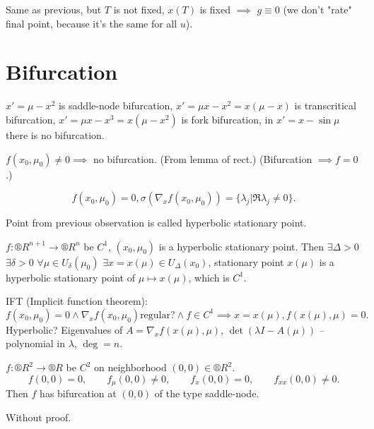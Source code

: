 \documentclass[12pt]{article}					%
\begin{document}
\begin{veta}
	Same as previous, but $T$ is not fixed, $x(T)$ is fixed $\implies$ $g ≡ 0$ (we don't "rate" final point, because it's the same for all $u$).
\end{veta}

\section{Bifurcation}
\begin{definice}
	$x' = \mu - x^2$ is saddle-node bifurcation, $x' = \mu x - x^2 = x(\mu - x)$ is transcritical bifurcation, $x' = \mu x - x^3 = x(\mu - x^2)$ is fork bifurcation, in $x' = x - \sin \mu$ there is no bifurcation.
\end{definice}

\begin{pozorovani}
	$f(x_0, \mu_0) ≠ 0 \implies $ no bifurcation. (From lemma of rect.) (Bifurcation $\implies f = 0$.)
\end{pozorovani}

\begin{pozorovani}
	$$ f(x_0, \mu_0) = 0, \sigma(\nabla_x f(x_0, \mu_0)) = \{\lambda_j | \Re \lambda_j ≠ 0\}. $$
\end{pozorovani}

\begin{definice}
	Point from previous observation is called hyperbolic stationary point.
\end{definice}

\begin{veta}
	$f: ®R^{n+1} \rightarrow ®R^n$ be $C^1$, $(x_0, \mu_0)$ is a hyperbolic stationary point. Then $\exists \Delta > 0$ $\exists \delta > 0$ $\forall \mu \in U_\delta(\mu_0)$ $\exists x = x(\mu) \in U_\Delta(x_0)$, stationary point $x(\mu)$ is a hyperbolic stationary point of $\mu \mapsto x(\mu)$, which is $C^1$.

	\begin{dukazin}
		IFT (Implicit function theorem):
		$$ f(x_0, \mu_0) = 0 \land \nabla_x f(x_0, \mu_0) \text{regular?} \land f \in C^1 \implies x = x(\mu), f(x(\mu), \mu) = 0. $$
		Hyperbolic? Eigenvalues of $A = \nabla_x f(x(\mu), \mu)$, $\det(\lambda I - A(\mu))$ – polynomial in $\lambda$, $\deg = n$.
	\end{dukazin}
\end{veta}

\begin{veta}
	$f: ®R^2 \rightarrow ®R$ be $C^2$ on neighborhood $(0, 0) \in ®R^2$.
	$$ f(0, 0) = 0, \qquad f_\mu(0, 0) ≠ 0, \qquad f_x(0, 0) = 0, \qquad f_{xx}(0, 0) ≠ 0. $$
	Then $f$ has bifurcation at $(0, 0)$ of the type saddle-node.

	\begin{dukazin}
		Without proof.
	\end{dukazin}
\end{veta}
\end{document}
